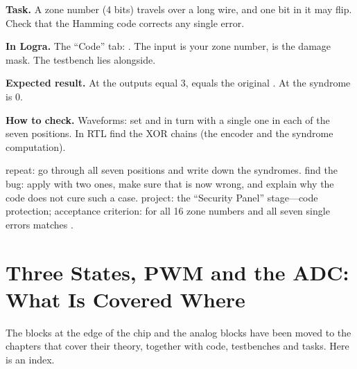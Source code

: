 \begin{diybox}
\textbf{Task.} A zone number (4 bits) travels over a long wire, and one bit in it may flip. Check that the Hamming code corrects any single error.

\textbf{In Logra.} The ``Code'' tab: . The input  is your zone number,  is the damage mask. The testbench  lies alongside.

\textbf{Expected result.} At  the outputs  equal 3,  equals the original . At  the syndrome is 0.

\textbf{How to check.} Waveforms: set  and in turn  with a single one in each of the seven positions. In RTL find the XOR chains (the encoder and the syndrome computation).

 repeat: go through all seven positions and write down the syndromes.  find the bug: apply  with two ones, make sure that  is now wrong, and explain why the code does not cure such a case.  project: the ``Security Panel'' stage---code protection; acceptance criterion: for all 16 zone numbers and all seven single errors  matches .
\end{diybox}

\section{Three States, PWM and the ADC: What Is Covered Where}
\label{sec:b-analog-ref}

The blocks at the edge of the chip and the analog blocks have been moved to the
chapters that cover their theory, together with code, testbenches and tasks. Here
is an index.

